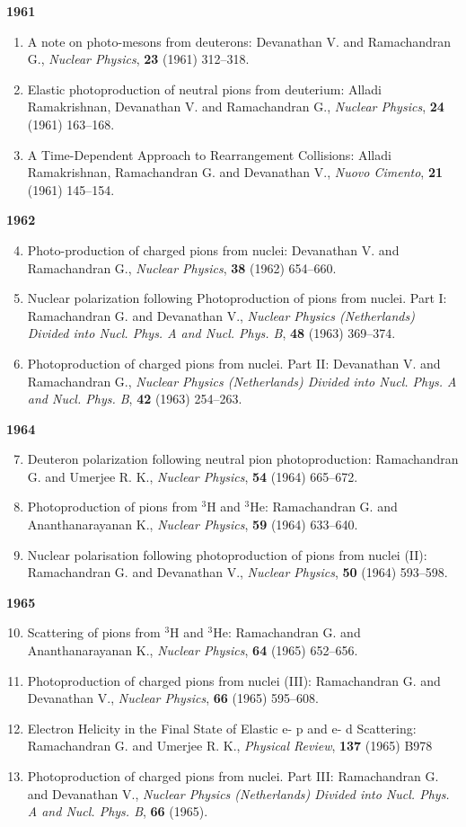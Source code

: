\noindent
\textbf{1961}
\begin{enumerate}
\item A note on photo-mesons from deuterons: Devanathan V. and Ramachandran G., \textit{Nuclear Physics}, {\bf 23} (1961) 312--318.
\item Elastic photoproduction of neutral pions from deuterium: Alladi Ramakrishnan, Devanathan V. and Ramachandran G., \textit{Nuclear Physics}, {\bf 24} (1961) 163--168.
\item A Time-Dependent Approach to Rearrangement Collisions: Alladi Ramakrishnan, Ramachandran G. and Devanathan V., \textit{Nuovo Cimento}, {\bf 21} (1961) 145--154.
\end{enumerate}
\noindent
\textbf{1962}
\begin{enumerate}
\setcounter{enumi}{3}
\item Photo-production of charged pions from nuclei: Devanathan V. and Ramachandran G., \textit{Nuclear Physics}, {\bf 38} (1962) 654--660.

\item Nuclear polarization following Photoproduction of pions from nuclei. Part I: Ramachandran G. and Devanathan V., \textit{Nuclear Physics (Netherlands) Divided
into Nucl. Phys. A and Nucl. Phys. B}, {\bf 48} (1963) 369--374.

\item Photoproduction of charged pions from nuclei. Part II: Devanathan V. and Ramachandran G., \textit{Nuclear Physics (Netherlands) Divided into Nucl. Phys. A and
Nucl. Phys. B}, {\bf 42} (1963) 254--263.
\end{enumerate}
\noindent
\textbf{1964}
\begin{enumerate}
\setcounter{enumi}{6}
\item Deuteron polarization following neutral pion photoproduction: Ramachandran G. and Umerjee R. K., \textit{Nuclear Physics}, {\bf 54} (1964) 665--672.
\item Photoproduction of pions from $^{3}$H and $^{3}$He: Ramachandran G. and Ananthanarayanan K., \textit{Nuclear Physics}, {\bf 59} (1964) 633--640.
\item Nuclear polarisation following photoproduction of pions from nuclei (II): Ramachandran G. and Devanathan V., \textit{Nuclear Physics}, {\bf 50} (1964) 593--598.
\end{enumerate}
\textbf{1965}
\begin{enumerate}
\setcounter{enumi}{9}
\item Scattering of pions from $^{3}$H and $^{3}$He: Ramachandran G. and Ananthanarayanan K., \textit{Nuclear Physics}, {\bf 64} (1965) 652--656.
\item Photoproduction of charged pions from nuclei (III): Ramachandran G. and Devanathan V., \textit{Nuclear Physics}, {\bf 66} (1965) 595--608.
\item Electron Helicity in the Final State of Elastic e- p and e- d Scattering: Ramachandran G. and Umerjee R. K., \textit{Physical Review}, {\bf 137} (1965) B978
\item Photoproduction of charged pions from nuclei. Part III: Ramachandran G. and Devanathan V., \textit{Nuclear Physics (Netherlands) Divided into Nucl. Phys. A and Nucl. Phys. B}, {\bf 66} (1965).
\end{enumerate}
